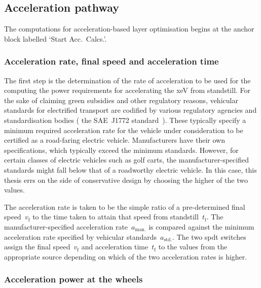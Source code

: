 \subsection{Acceleration pathway}

The computations for acceleration-based layer  optimisation begins at the anchor
block labelled `Start Acc.\ Calcs.'.

\subsubsection*{Acceleration rate, final speed and acceleration time}

The  first   step  is  the  determination   of  the  rate  of   acceleration  to
be  used  for  the  computing   the  power  requirements  for  accelerating  the
\gls{xeV}  from  standstill.  For  the  sake of  claiming  green  subsidies  and
other  regulatory reasons,  vehicular  standards for  electrified transport  are
codified by  various regulatory agencies  and standardisation bodies  (\eg{} the
SAE~J1772 standard~\cite{Sae2010}).  These typically specify a  minimum required
acceleration  rate for  the vehicle  under consideration  to be  certified as  a
road-faring electric vehicle. Manufacturers have their own specifications, which
typically exceed the minimum standards. However, for certain classes of electric
vehicles such  as golf  carts, the  manufacturer-specified standards  might fall
below that of a  roadworthy electric vehicle. In this case,  this thesis errs on
the side of conservative design by choosing the higher of the two values.

The   acceleration   rate   is   taken   to   be   the   simple   ratio   of   a
pre-determined  final  speed~$v_\text{f}$  to  the time  taken  to  attain  that
speed  from  standstill~$t_\text{f}$.  The  manufacturer-specified  acceleration
rate~$a_\text{man.}$ is compared against the minimum acceleration rate specified
by vehicular  standards~$a_\text{std.}$. The two \gls{spdt}  switches assign the
final speed~$v_\text{f}$  and acceleration time~$t_\text{f}$ to  the values from
the  appropriate source  depending on  which of  the two  acceleration rates  is
higher.

\subsubsection*{Acceleration power at the wheels}

